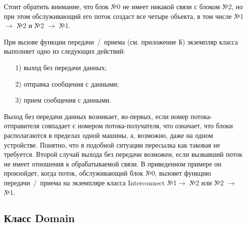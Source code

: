 \documentclass[a4paper, 14pt]{extarticle}
\theoremstyle{definition}
\begin{document}
\par Стоит обратить внимание, что блок №0 не имеет никакой связи с блоком №2, но при этом обслуживающий его поток создаст все четыре объекта, в том числе {№1 $\to$ №2} и {№2 $\to$ №1}. 

\par При вызове функции передачи~/~приема (см. приложение Б) экземпляр класса выполняет одно из следующих действий:
\begin{enumerate}
\item[1)] выход без передачи данных;
\item[2)] отправка сообщения с данными;
\item[3)] прием сообщения с данными.
\end{enumerate}

\par Выход без передачи данных возникает, во-первых, если номер потока-отправителя совпадает с номером потока-получателя, что означает, что блоки располагаются в пределах одной машины, а, возможно, даже на одном устройстве. Понятно, что в подобной ситуации пересылка как таковая не требуется. Второй случай выхода без передачи возможен, если вызвавший поток не имеет отношения к обрабатываемой связи. В приведенном примере он произойдет, когда поток, обслуживающий блок №0, вызовет функцию передачи~/~приема на экземпляре класса Interconnect {№1$\to$ №2} или {№2 $\to$ №1}.



\subsection{Класс Domain}
\end{document}
